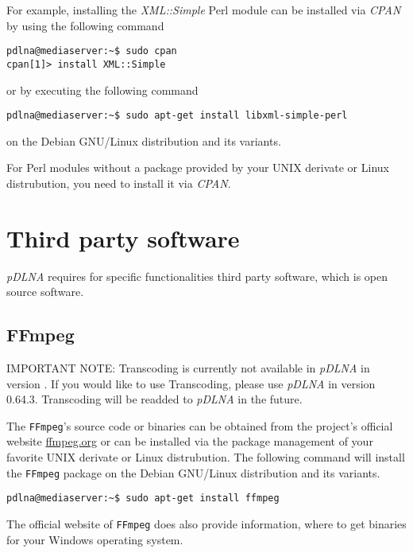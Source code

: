 For example, installing the {\em XML::Simple} Perl module can be installed via {\em CPAN} by using the following command
\begin{lstlisting}
pdlna@mediaserver:~$ sudo cpan
cpan[1]> install XML::Simple
\end{lstlisting}
or by executing the following command
\begin{lstlisting}
pdlna@mediaserver:~$ sudo apt-get install libxml-simple-perl
\end{lstlisting}
on the Debian GNU/Linux distribution and its variants.

For Perl modules without a package provided by your UNIX derivate or Linux distrubution, you need to install it via {\em CPAN}.

\section{Third party software}

{\em pDLNA} requires for specific functionalities third party software, which is open source software.

\subsection{FFmpeg}
\label{ffmpeg}

\begin{colframeimportantnote}
\textsc{IMPORTANT NOTE:} Transcoding is currently not available in {\em pDLNA} in version \pDLNAversion. If you would like to use Transcoding, please use {\em pDLNA} in version 0.64.3. Transcoding will be readded to {\em pDLNA} in the future.
\end{colframeimportantnote}

%

The \verb|FFmpeg|'s source code or binaries can be obtained from the project's official website \url{ffmpeg.org} or can be installed via the package management of your favorite UNIX derivate or Linux distrubution. The following command will install the \verb|FFmpeg| package on the Debian GNU/Linux distribution and its variants.

\begin{lstlisting}
pdlna@mediaserver:~$ sudo apt-get install ffmpeg
\end{lstlisting}

The official website of \verb|FFmpeg| does also provide information, where to get binaries for your Windows operating system.